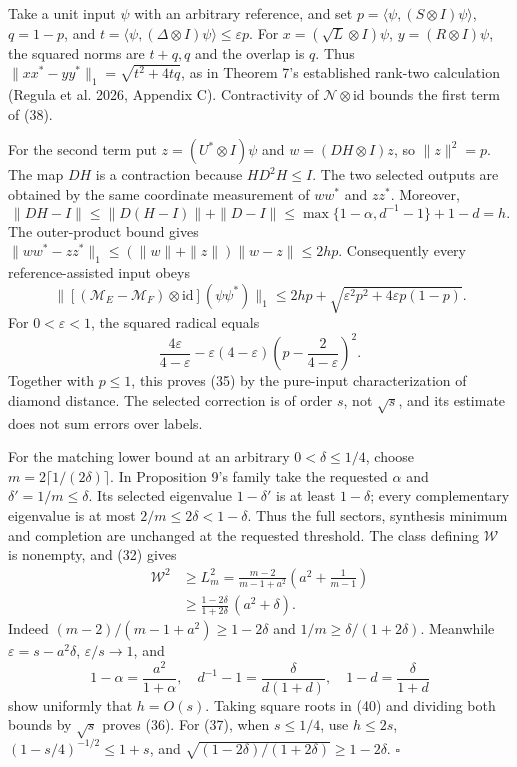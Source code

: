 \documentclass[
  11pt,
  a4paper,
]{article}
\begin{document}
Take a unit input \(\psi\) with an arbitrary reference, and set
\(p=\langle\psi,(S\otimes I)\psi\rangle\), \(q=1-p\), and
\(t=\langle\psi,(\Delta\otimes I)\psi\rangle\le\varepsilon p\). For
\(x=(\sqrt L\otimes I)\psi\), \(y=(R\otimes I)\psi\), the squared norms
are \(t+q,q\) and the overlap is \(q\). Thus
\(\|xx^*-yy^*\|_1=\sqrt{t^2+4tq}\), as in Theorem 7's established
rank-two calculation (Regula et al. 2026, Appendix C). Contractivity of
\(\mathcal N\otimes\mathrm{id}\) bounds the first term of (38).

For the second term put \(z=(U^*\otimes I)\psi\) and
\(w=(DH\otimes I)z\), so \(\|z\|^2=p\). The map \(DH\) is a contraction
because \(HD^2H\le I\). The two selected outputs are obtained by the
same coordinate measurement of \(ww^*\) and \(zz^*\). Moreover,
\[\|DH-I\|\le\|D(H-I)\|+\|D-I\|
\le\max\{1-\alpha,d^{-1}-1\}+1-d=h.\] The outer-product bound gives
\(\|ww^*-zz^*\|_1\le(\|w\|+\|z\|)\|w-z\|\le2hp\). Consequently every
reference-assisted input obeys
\[\|[(\mathcal M_E-\mathcal M_F)\otimes\mathrm{id}](\psi\psi^*)\|_1
\le2hp+\sqrt{\varepsilon^2p^2+4\varepsilon p(1-p)}.
\tag{39}\] For \(0<\varepsilon<1\), the squared radical equals
\[\frac{4\varepsilon}{4-\varepsilon}
-\varepsilon(4-\varepsilon)\left(p-\frac2{4-\varepsilon}\right)^2.\]
Together with \(p\le1\), this proves (35) by the pure-input
characterization of diamond distance. The selected correction is of
order \(s\), not \(\sqrt s\), and its estimate does not sum errors over
labels.

For the matching lower bound at an arbitrary \(0<\delta\le1/4\), choose
\(m=2\lceil1/(2\delta)\rceil\). In Proposition 9's family take the
requested \(\alpha\) and \(\delta'=1/m\le\delta\). Its selected
eigenvalue \(1-\delta'\) is at least \(1-\delta\); every complementary
eigenvalue is at most \(2/m\le2\delta<1-\delta\). Thus the full sectors,
synthesis minimum and completion are unchanged at the requested
threshold. The class defining \(\mathcal W\) is nonempty, and (32) gives
\[\begin{aligned}
\mathcal W^2&\ge L_m^2
=\frac{m-2}{m-1+a^2}\left(a^2+\frac1{m-1}\right)\\
&\ge\frac{1-2\delta}{1+2\delta}\,(a^2+\delta).
\end{aligned}
\tag{40}\] Indeed \((m-2)/(m-1+a^2)\ge1-2\delta\) and
\(1/m\ge\delta/(1+2\delta)\). Meanwhile \(\varepsilon=s-a^2\delta\),
\(\varepsilon/s\to1\), and \[1-\alpha=\frac{a^2}{1+\alpha},\quad
d^{-1}-1=\frac{\delta}{d(1+d)},\quad
1-d=\frac{\delta}{1+d}\] show uniformly that \(h=O(s)\). Taking square
roots in (40) and dividing both bounds by \(\sqrt s\) proves (36). For
(37), when \(s\le1/4\), use \(h\le2s\), \((1-s/4)^{-1/2}\le1+s\), and
\(\sqrt{(1-2\delta)/(1+2\delta)}\ge1-2\delta\). \(\square\)
\end{document}
